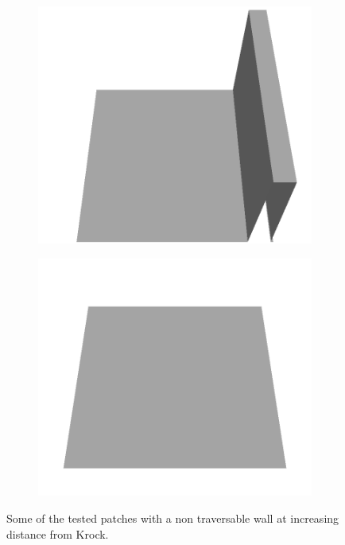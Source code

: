 \begin{figure}[H]
\begin{subfigure}[b]{0.24\textwidth}
    \includegraphics[width=\linewidth]{../img/5/custom_patches/walls_front/all/23-3d.png}
    \end{subfigure}
    \begin{subfigure}[b]{0.24\textwidth}
    \includegraphics[width=\linewidth]{../img/5/custom_patches/walls_front/all/25-3d.png}
    \end{subfigure}
    \caption{Some of the tested patches with a non traversable wall at increasing distance from Krock.}
    \end{figure}

